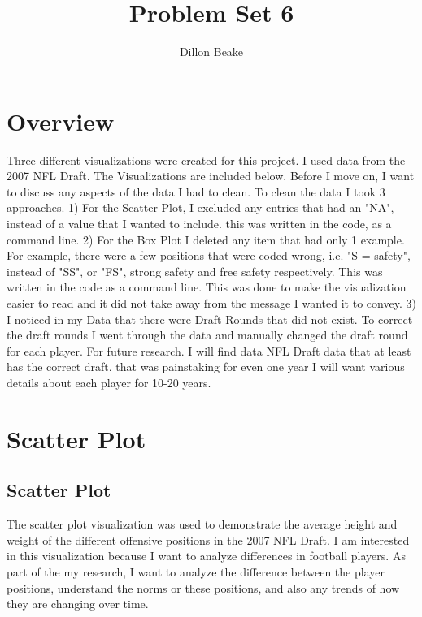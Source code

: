 \documentclass{article}
\title{Problem Set 6}
\author{Dillon Beake}
\begin{document}
\maketitle


\section{Overview}

Three different visualizations were created for this project. I used data from the 2007 NFL Draft. The Visualizations are included below.  
Before I move on, I want to discuss any aspects of the data I had to clean.  
\linespread{1.6} %
To clean the data I took 3 approaches.  
\linespread{1.6} %
1) For the Scatter Plot, I excluded any entries that had an "NA", instead of a value that I wanted to include.  this was written in the code, as a command line. 
\linespread{1.6} %
2) For the Box Plot I deleted any item that had only 1 example.  For example, there were a few positions that were coded wrong, i.e. "S = safety", instead of "SS", or "FS", strong safety and free safety respectively. This was written in the code as a  command line. This was done to make the visualization easier to read and it did not take away from the message I wanted it to convey.  
\linespread{1.6} %
3) I noticed in my Data that there were Draft Rounds that did not exist.  To correct the draft rounds I went through the data and manually changed the draft round for each player. For future research.  I will find data NFL Draft data that at least has the correct draft. that was painstaking for even one year I will want various details about each player for 10-20 years.

\section{Scatter Plot}

\subsection{Scatter Plot}

The scatter plot visualization was used to demonstrate the average height and weight of the different offensive positions in the 2007 NFL Draft.  I am interested in this visualization because I want to analyze differences in football players.  As part of the my research, I want to analyze the difference between the player positions, understand the norms or these positions, and also any trends of how they are changing over time.   
\end{document}
